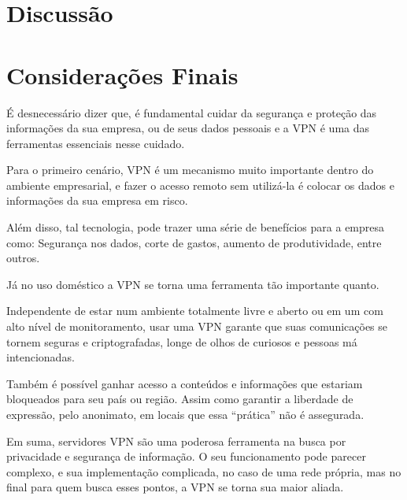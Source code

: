 \documentclass[12pt]{article}
\begin{document}
\begin{flushleft}
\section{Discussão}


\section{Considerações Finais}

É desnecessário dizer que, é fundamental cuidar da segurança e proteção das informações da sua empresa, ou de seus dados pessoais e a VPN é uma das ferramentas essenciais nesse cuidado.

Para o primeiro cenário, VPN é um mecanismo muito importante dentro do ambiente empresarial, e fazer o acesso remoto sem utilizá-la é colocar os dados e informações da sua empresa em risco.

Além disso, tal tecnologia, pode trazer uma série de benefícios para a empresa como: Segurança nos dados, corte de gastos, aumento de produtividade, entre outros.

Já no uso doméstico a VPN se torna uma ferramenta tão importante quanto. 

Independente de estar num ambiente totalmente livre e aberto ou em um com alto nível de monitoramento, usar uma VPN garante que suas comunicações se tornem seguras e criptografadas, longe de olhos de curiosos e pessoas má intencionadas.

Também é possível ganhar acesso a conteúdos e informações que estariam bloqueados para seu país ou região. Assim como garantir a liberdade de expressão, pelo anonimato, em locais que essa “prática” não é assegurada. 

Em suma, servidores VPN são uma poderosa ferramenta na busca por privacidade e segurança de informação. O seu funcionamento pode parecer complexo, e sua implementação complicada, no caso de uma rede própria, mas no final para quem busca esses pontos, a VPN se torna sua maior aliada. 






\end{flushleft}
\end{document}
